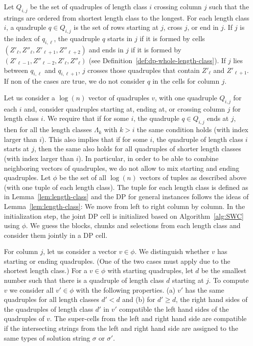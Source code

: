 Let $Q_{i,j}$ be the set of quadruples of length class $i$ crossing column $j$ such that the strings are ordered from shortest length class to the longest.
For each length class $i$, a quadruple $q \in Q_{i,j}$ is the set of rows starting at $j$, cross $j$, or end in $j$.
If $j$ is the index of $q_{i,\ell}$,
the quadruple $q$ starts in $j$ if it is formed by cells $(Z'_\ell,Z''_\ell,Z'_{\ell+1},Z''_{\ell+2})$ and ends in $j$ if it is formed by $(Z'_{\ell-1},Z''_{\ell-2},Z'_\ell,Z''_\ell)$ (see Definition~\ref{def:dp-whole-length-class}).
If $j$ lies between $q_{i,\ell}$ and $q_{i,\ell+1}$, $j$ crosses those quadruples that contain $Z'_\ell$ and $Z'_{\ell+1}$.
If non of the cases are true, we do not consider $q$ in the cells for column $j$.

Let us consider a $\log(n)$ vector of quadruples $v$, with one quadruple $Q_{i,j}$ for each $i$ and, consider quadruples starting at, ending at, or crossing column $j$ for length class $i$.
We require that if for some $i$, the quadruple $q \in Q_{i,j}$ ends at $j$, then for all the length classes $\Lambda_k$ with $k>i$ the same condition holds (with index larger than $i$).
This also implies that if for some $i$, the quadruple of length class $i$ starts at $j$, then the same also holds for all quadruples of shorter length classes (with index larger than $i$).
In particular, in order to be able to combine neighboring vectors of quadruples, we do not allow to mix starting and ending quadruples.
Let $\phi$ be the set of all $\log(n)$ vectors of tuples as described above (with one tuple of each length class).
The tuple for each length class is defined as in Lemma~\ref{lem:length-class} and the DP for general instances follows the ideas of Lemma~\ref{lem:length-class}:
We move from left to right column by column. In the initialization step, the joint DP cell is initialized based on Algorithm~\ref{alg:SWC} using $\phi$.
We guess the blocks, chunks and selections from each length class and consider them jointly in a DP cell.

For column $j$, let us consider a vector $v \in \phi$.
We distinguish whether $v$ has starting or ending quadruples. 
(One of the two cases must apply due to the shortest length class.)
For a $v \in \phi$ with starting quadruples,
let $d$ be the smallest number such that there is a quadruple of length class $d$ starting at $j$.
To compute $v$ we consider all $v' \in \phi$ with the following properties.
(a) $v'$ has the same quadruples for all length classes $d' < d$ and 
(b) for $d' \ge d$, the right hand sides of the quadruples of length class $d'$ in $v'$ compatible the left hand sides of the quadruples of $v$.
The super-cells from the left and right hand side are compatible if the intersecting strings from the left and right hand side are assigned to the same types of solution string $\sigma$ or $\sigma'$.

